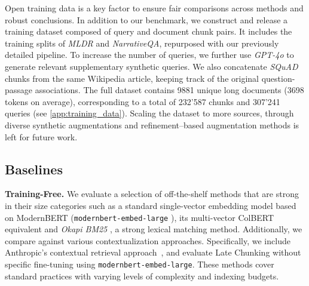 Open training data is a key factor to ensure fair comparisons across methods and robust conclusions. In addition to our benchmark, we construct and release a training dataset composed of query and document chunk pairs. It includes the training splits of \emph{MLDR} and \emph{NarrativeQA}, repurposed with our previously detailed pipeline. To increase the number of queries, we further use \emph{GPT-4o} to generate relevant supplementary synthetic queries. We also concatenate \emph{SQuAD} chunks from the same Wikipedia article, keeping track of the original question-passage associations.
The full dataset contains 9881 unique long documents (3698 tokens on average), corresponding to a total of 232'587 chunks and 307'241 queries (see \autoref{app:training_data}). Scaling the dataset to more sources, through diverse synthetic augmentations and refinement–based augmentation methods  is left for future work.


\subsection{Baselines}



\noindent\textbf{Training-Free.} We evaluate a selection of off-the-shelf methods that are strong in their size categories such as a standard single-vector embedding model based on ModernBERT (\texttt{modernbert-embed-large} \cite{modernbert, ModernBERT-embed-large}), its multi-vector ColBERT equivalent  and \emph{Okapi BM25} , a strong lexical matching method. 
Additionally, we compare against various contextualization approaches. Specifically, we include Anthropic’s contextual retrieval approach~, and evaluate Late Chunking  without specific fine-tuning using \texttt{modernbert-embed-large}. These methods cover standard practices with varying levels of complexity and indexing budgets.

